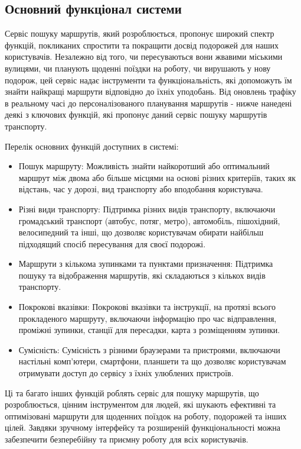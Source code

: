 \subsection{Основний функціонал системи}
\label{subsec:features-subsection}

Сервіс пошуку маршрутів, який розроблюється, пропонує широкий спектр функцій, покликаних спростити та покращити досвід подорожей для наших користувачів. Незалежно від того, чи пересуваються вони жвавими міськими вулицями, чи планують щоденні поїздки на роботу, чи вирушають у нову подорож, цей сервіс надає інструменти та функціональність, які допоможуть їм знайти найкращі маршрути відповідно до їхніх уподобань. Від оновлень трафіку в реальному часі до персоналізованого планування маршрутів - нижче нанедені деякі з ключових функцій, які пропонує даний сервіс пошуку маршрутів транспорту.

Перелік основних функцій доступних в системі:
\begin{itemize}
    \item Пошук маршруту: Можливість знайти найкоротший або оптимальний маршрут між двома або більше місцями на основі різних критеріїв, таких як відстань, час у дорозі, вид транспорту або вподобання користувача.
    \item Різні види транспорту: Підтримка різних видів транспорту, включаючи громадський транспорт (автобус, потяг, метро), автомобіль, пішохідний, велосипедний та інші, що дозволяє користувачам обирати найбільш підходящий спосіб пересування для своєї подорожі.
    \item Маршрути з кількома зупинками та пунктами призначення: Підтримка пошуку та відображення маршрутів, які складаються з кількох видів транспорту.
    \item Покрокові вказівки: Покрокові вказівки та інструкції, на протязі всього прокладеного маршруту, включаючи інформацію про час відправлення, проміжні зупинки, станції для пересадки, карта з розміщенням зупинки.
    \item Сумісність: Сумісність з різними браузерами та пристроями, включаючи настільні комп'ютери, смартфони, планшети та що дозволяє користувачам отримувати доступ до сервісу з їхніх улюблених пристроїв.
\end{itemize}

Ці та багато інших функцій роблять сервіс для пошуку маршрутів, що розроблюється, цінним інструментом для людей, які шукають ефективні та оптимізовані маршрути для щоденних поїздок на роботу, подорожей та інших цілей. Завдяки зручному інтерфейсу та розширеній функціональності можна забезпечити безперебійну та приємну роботу для всіх користувачів.